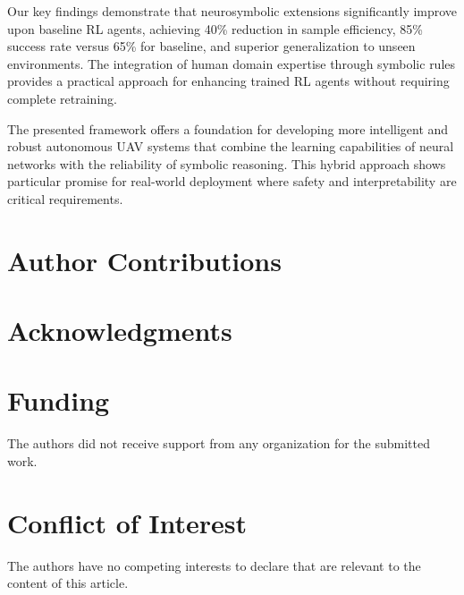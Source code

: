 \documentclass[pdflatex,sn-mathphys-num]{sn-jnl}
\theoremstyle{thmstyleone}%
\theoremstyle{thmstyletwo}%
\theoremstyle{thmstylethree}%
\begin{document}
Our key findings demonstrate that neurosymbolic extensions significantly improve upon baseline RL agents, achieving 40\% reduction in sample efficiency, 85\% success rate versus 65\% for baseline, and superior generalization to unseen environments. The integration of human domain expertise through symbolic rules provides a practical approach for enhancing trained RL agents without requiring complete retraining.

The presented framework offers a foundation for developing more intelligent and robust autonomous UAV systems that combine the learning capabilities of neural networks with the reliability of symbolic reasoning. This hybrid approach shows particular promise for real-world deployment where safety and interpretability are critical requirements.



\section*{Author Contributions}


\section*{Acknowledgments}


\section*{Funding}
The authors did not receive support from any organization for the submitted work.

\section*{Conflict of Interest}
The authors have no competing interests to declare that are relevant to the content of this article.



\end{document}

